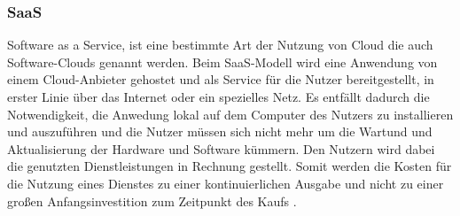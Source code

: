 \documentclass[12pt,bibtotoc]{article}
\begin{document}
		\newpage
		\subsubsection{SaaS}
		Software as a Service, ist eine bestimmte Art der Nutzung von Cloud die auch Software-Clouds genannt werden. 
		Beim SaaS-Modell wird eine Anwendung von einem Cloud-Anbieter gehostet und als Service für die Nutzer bereitgestellt, in erster Linie über das Internet oder ein spezielles Netz.
		Es entfällt dadurch die Notwendigkeit, die Anwedung lokal auf dem Computer des Nutzers zu installieren und auszuführen und die Nutzer müssen sich nicht mehr um die Wartund und Aktualisierung der Hardware und Software kümmern.
		Den Nutzern wird dabei die genutzten Dienstleistungen in Rechnung gestellt. Somit werden die Kosten für die Nutzung eines Dienstes zu einer kontinuierlichen Ausgabe und nicht zu einer großen Anfangsinvestition zum Zeitpunkt des Kaufs \cite{Murugesan.2016}.
		
\end{document}

